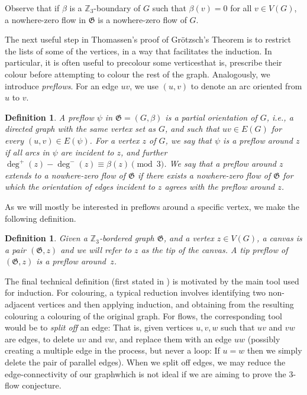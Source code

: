 \documentclass{article}
\newcommand{\Z}{\mathbb{Z}_3}
\newcommand\g{\mathfrak{G}}
\newtheorem{definition}[theorem]{Definition}
\begin{document}
Observe that if $\beta$ is a $\Z$-boundary of $G$ such that $\beta(v) = 0$ for all $v \in V(G)$, a nowhere-zero flow in $\g$ is a nowhere-zero flow of $G$.

The next useful step in Thomassen's proof of Grötzsch's Theorem is to restrict the lists of some of the vertices, in a way that facilitates the induction. In particular, it is often useful to precolour some vertices\textemdash that is, prescribe their colour before attempting to colour the rest of the graph. Analogously, we introduce \emph{preflows}.  For an edge $uv$, we use $(u,v)$ to denote an arc oriented from $u$ to $v$.

\begin{definition}
A \emph{preflow} $\psi$ in $\g =(G,\beta)$ is a partial orientation of $G$, i.e., a directed graph with the same vertex set as $G$, and such that $uv\in E(G)$ for every $(u,v)\in E(\psi)$.  For a vertex $z$ of $G$, we say that $\psi$ is a \emph{preflow around $z$} if all arcs in $\psi$ are incident to $z$, and further $\deg^{+}(z) - \deg^{-}(z) \equiv \beta(z) \pmod 3$. We say that a preflow around $z$ \emph{extends to a nowhere-zero flow} of $\g$ if there exists a nowhere-zero flow of $\g$ for which the orientation of edges incident to $z$ agrees with the preflow around $z$.
\end{definition}


As we will mostly be interested in preflows around a specific vertex, we make the following definition.

\begin{definition}
Given a $\Z$-bordered graph $\g$, and a vertex $z \in V(G)$, a \emph{canvas} is
a pair $(\g,z)$ and we will refer to $z$ as the \emph{tip} of the canvas. A
\emph{tip preflow} of $(\g,z)$ is a preflow around~$z$.
\end{definition}



The final technical definition (first stated in \cite{weak3flow}) is motivated
by the main tool used for induction. For colouring, a typical reduction
involves identifying two non-adjacent vertices and then applying induction, and
obtaining from the resulting colouring a colouring of the original graph. For
flows, the corresponding tool would be to \textit{split off} an edge: That is,
given vertices $u,v,w$ such that $uv$ and $vw$ are edges, to delete $uv$ and
$vw$, and replace them with an edge $uw$ (possibly creating a multiple edge in
the process, but never a loop: If $u=w$ then we simply delete the pair of
parallel edges). When we split off edges, we may reduce the edge-connectivity
of our graph\textemdash which is not ideal if we are aiming to prove the
$3$-flow conjecture.
\end{document}
